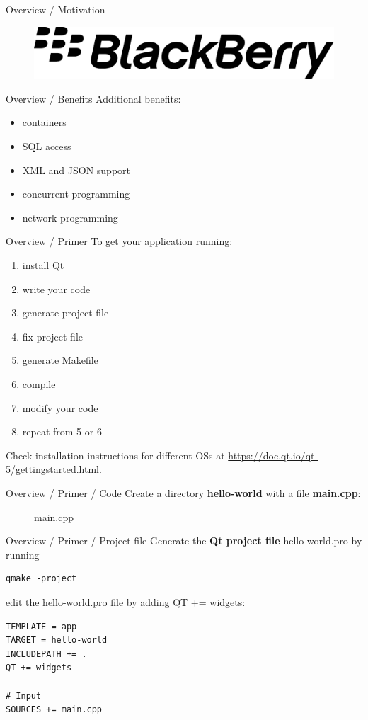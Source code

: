 \documentclass[11pt]{beamer}
\renewcommand{\emph}[1]{\textbf{#1}}
\begin{document}
\begin{frame}{Overview / Motivation}
\begin{figure}
  \includegraphics[height=0.07\textheight]{assets/logo-blackberry}
 \end{figure}
\end{frame}

\begin{frame}{Overview / Benefits}
 Additional benefits:
 \begin{itemize}
  \item containers
  \item SQL access
  \item XML and JSON support
  \item concurrent programming
  \item network programming
 \end{itemize}
\end{frame}

\begin{frame}{Overview / Primer}
 To get your application running:
 \begin{enumerate}
  \item install Qt
  \item write your code
  \item generate project file
  \item fix project file
  \item generate Makefile
  \item compile
  \item modify your code
  \item repeat from 5 or 6
 \end{enumerate}
 Check installation instructions for different OSs at \url{https://doc.qt.io/qt-5/gettingstarted.html}.
\end{frame}

\begin{frame}{Overview / Primer / Code}
 Create a directory \emph{hello-world} with a file \emph{main.cpp}:
 \begin{figure}
  
  \caption{main.cpp}
 \end{figure}
\end{frame}

\begin{frame}[fragile]{Overview / Primer / Project file}
 Generate the \emph{Qt project file} hello-world.pro by running
 \begin{lstlisting}
qmake -project
\end{lstlisting}
 edit the hello-world.pro file by adding QT += widgets:
 \begin{lstlisting}
TEMPLATE = app
TARGET = hello-world
INCLUDEPATH += .
QT += widgets

# Input
SOURCES += main.cpp
\end{lstlisting}
\end{frame}
\end{document}
